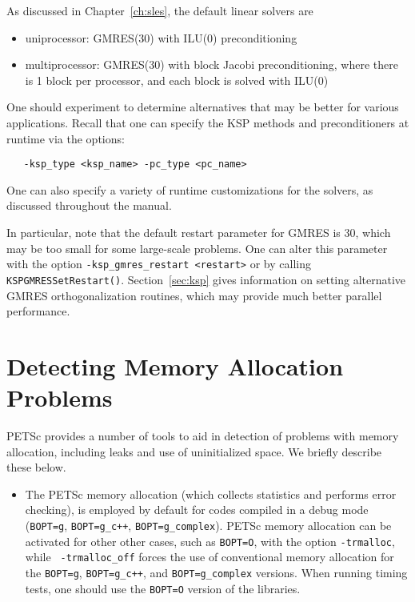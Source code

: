 {As discussed in Chapter~\ref{ch:sles}, the default linear solvers are
\begin{itemize}
\item uniprocessor: GMRES(30) with ILU(0) preconditioning\\
\item multiprocessor: GMRES(30) with block Jacobi preconditioning, where there
                     is 1 block per processor, and each block is solved with ILU(0)\\
\end{itemize}
One should experiment to determine alternatives that may be better for
various applications.  Recall that one can specify the KSP methods and
preconditioners at runtime via the options:
\begin{verbatim}
   -ksp_type <ksp_name> -pc_type <pc_name>
\end{verbatim}
One can also specify a variety of runtime customizations for the
solvers, as discussed throughout the manual.

In particular, note that the default restart parameter for GMRES is
30, which may be too small for some large-scale problems.  One can alter this
parameter with the option {\tt -ksp\_gmres\_restart <restart>} or by
calling {\tt KSPGMRESSetRestart()}. Section~\ref{sec:ksp} gives
information on setting alternative GMRES orthogonalization routines,
which may provide much better parallel performance.

\section{Detecting Memory Allocation Problems}

PETSc provides a number of tools to aid in detection of problems
with memory allocation, including leaks and use of uninitialized space.
We briefly describe these below.
 

 
\begin{itemize}
\item The PETSc memory allocation (which collects statistics and performs
error checking), is employed by default for codes compiled in a
debug mode ({\tt BOPT=g}, {\tt BOPT=g\_c++}, {\tt BOPT=g\_complex}).
PETSc memory allocation can be activated for other other cases, such
as {\tt BOPT=O}, with the option {\tt -trmalloc}, while {\tt
-trmalloc\_off} forces the use of conventional memory allocation for the
{\tt BOPT=g}, {\tt BOPT=g\_c++}, and {\tt BOPT=g\_complex} versions.
When running timing tests, one should use  
the {\tt BOPT=O} version of the libraries.


\end{itemize}}

